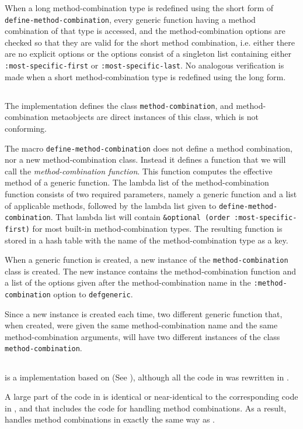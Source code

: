 When a long method-combination type is redefined using the short form
of \texttt{define-method-combination}, every generic function having
a method combination of that type is accessed, and the
method-combination options are checked so that they are valid for the
short method combination, i.e. either there are no explicit options or
the options consist of a singleton list containing either
\texttt{:most-specific-first} or \texttt{:most-specific-last}.  No
analogous verification is made when a short method-combination type is
redefined using the long form.

\subsection{\ecl{}}
\label{sec-ecl}

The \ecl{} \commonlisp{} implementation defines the class
\texttt{method-combination}, and method-combination metaobjects are
direct instances of this class, which is not conforming.

The macro \texttt{define-method-combination} does not define a method
combination, nor a new method-combination class.  Instead it defines a
function that we will call the \emph{method-combination function}.
This function computes the effective method of a generic function.
The lambda list of the method-combination function consists of two
required parameters, namely a generic function and a list of
applicable methods, followed by the lambda list given to
\texttt{define-method-combination}.  That lambda list will contain
\texttt{\&optional (order :most-specific-first)} for most built-in
method-combination types.  The resulting function is stored in a hash
table with the name of the method-combination type as a key.

When a generic function is created, a new instance of the
\texttt{method-combination} class is created.  The new instance
contains the method-combination function and a list of the options
given after the method-combination name in the
\texttt{:method-combination} option to \texttt{defgeneric}.

Since a new instance is created each time, two different generic
function that, when created, were given the same method-combination
name and the same method-combination arguments, will have two
different instances of the class \texttt{method-combination}.

\subsection{\clasp{}}

\clasp{} is a \commonlisp{} implementation based on \ecl{} (See
), although all the \clanguage{} code in \ecl{} was
rewritten in \cplusplus{}.

A large part of the \commonlisp{} code in \clasp{} is identical or
near-identical to the corresponding code in \ecl{}, and that includes
the code for handling method combinations.  As a result, \clasp{}
handles method combinations in exactly the same way as \ecl{}.
